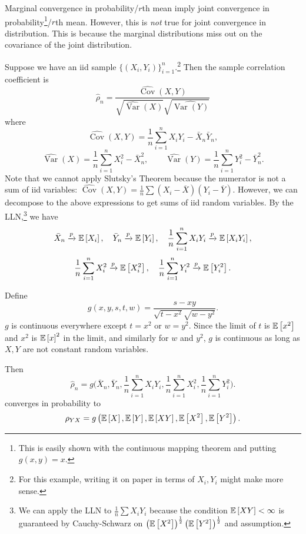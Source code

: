 \begin{aside}	Marginal convergence in probability/$r$th mean imply joint convergence in probability\footnote{This is easily shown with the continuous mapping theorem and putting $g(x,y) = x$.}/$r$th mean. However, this is \emph{not} true for joint convergence in distribution. This is because the marginal distributions miss out on the covariance of the joint distribution.
\end{aside}

\begin{example}
	Suppose we have an iid sample $\{(X_i,Y_i)\}_{i=1}^n$.\footnote{For this example, writing it on paper in terms of $X_i, Y_i$ might make more sense.} Then the sample correlation coefficient is
	\[
		\hat\rho_n=\frac{\widehat{\operatorname{Cov}}(X,Y)}{\sqrt{\widehat{\operatorname{Var}}(X)}\sqrt{\widehat{\operatorname{Var}\left(Y\right)}}}
	\]
	where
	\[
		\widehat{\operatorname{Cov}}(X,Y)=\frac{1}{n}\sum_{i=1}^n X_iY_i-\bar X_n\bar Y_n,
	\] \[
		\widehat{\operatorname{Var}}(X)=\frac{1}{n}\sum_{i=1}^n X_i^2-\bar X_n^2,
		\qquad
		\widehat{\operatorname{Var}}(Y)=\frac{1}{n}\sum_{i=1}^n Y_i^2-\bar Y_n^2.
	\]
	Note that we cannot apply Slutsky's Theorem because the numerator is not a sum of iid variables: $\widehat{\operatorname{Cov}}(X,Y) = \frac{1}{n} \sum (X_i - \overline{X})(Y_i - \overline{Y})$. However, we can decompose to the above expressions to get sums of iid random variables.
	By the LLN,\footnote{We can apply the LLN to $\frac{1}{n}\sum X_i Y_i$ because the condition $\mathbb{E}\left[XY\right] < \infty$ is guaranteed by Cauchy-Schwarz on $\left( \mathbb{E}\left[X^2\right]  \right)^{\frac{1}{2}} \left( \mathbb{E}\left[Y^2\right]  \right)^{\frac{1}{2}}$ and assumption.} we have
	\[
		\bar X_n\xrightarrow{p}\mathbb{E}\left[X_i\right],
		\quad
		\bar Y_n\xrightarrow{p}\mathbb{E}\left[Y_i\right],
		\quad
		\frac{1}{n}\sum_{i=1}^n X_iY_i\xrightarrow{p}\mathbb{E}\left[X_iY_i\right],
	\] \[
		\frac{1}{n}\sum_{i=1}^n X_i^2\xrightarrow{p}\mathbb{E}\left[X_i^2\right],
		\quad
		\frac{1}{n}\sum_{i=1}^n Y_i^2\xrightarrow{p}\mathbb{E}\left[Y_i^2\right].
	\]

	Define
	\[
		g(x,y,s,t,w)=\frac{s-xy}{\sqrt{t-x^2}\sqrt{w-y^2}}.
	\]
	$g$ is continuous everywhere except $t = x^2$ or $w = y^2$. Since the limit of $t$ is $\mathbb{E}\left[x^2\right]$ and $x^2$ is $\mathbb{E}\left[x\right] ^2$ in the limit, and similarly for $w$ and $y^2$, $g$ is continuous as long as $X,Y$ are not constant random variables.

	Then
	\[
		\hat\rho_n=g\Big(\bar X_n,\bar Y_n,\frac{1}{n}\sum_{i=1}^n X_iY_i,\frac{1}{n}\sum_{i=1}^n X_i^2,\frac{1}{n}\sum_{i=1}^n Y_i^2\Big).
	\] converges in probability to \[
		\rho_{YX} = g\left( \mathbb{E}\left[X\right] ,\mathbb{E}\left[Y\right] ,\mathbb{E}\left[XY\right] ,\mathbb{E}\left[X^2\right] ,\mathbb{E}\left[Y^2\right]  \right)
		.\]

\end{example}

